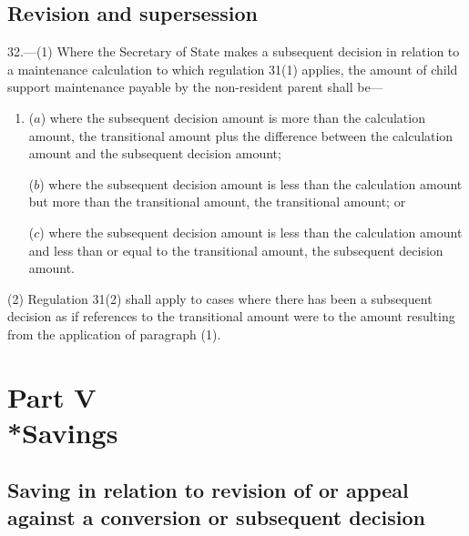 \documentclass[12pt,a4paper]{article}
\begin{document}
\subsection[32. Revision and supersession]{Revision and supersession
}

32.---(1)  Where the Secretary of State makes a subsequent decision in relation to a maintenance calculation to which regulation 31(1) applies, the amount of child support maintenance payable by the non-resident parent shall be—
\begin{enumerate}\item[]
($a$) where the subsequent decision amount is more than the calculation amount, the transitional amount plus the difference between the calculation amount and the subsequent decision amount;

($b$) where the subsequent decision amount is less than the calculation amount but more than the transitional amount, the transitional amount; or

($c$) where the subsequent decision amount is less than the calculation amount and less than or equal to the transitional amount, the subsequent decision amount.
\end{enumerate}

(2) Regulation 31(2) shall apply to cases where there has been a subsequent decision as if references to the transitional amount were to the amount resulting from the application of paragraph (1).

\section[Part V --- Savings]{Part V\\*Savings}

\renewcommand\parthead{--- Part V}

\subsection[33. Saving in relation to revision of or appeal against a conversion or subsequent decision]{Saving in relation to revision of or appeal against a conversion or subsequent decision}
\end{document}
